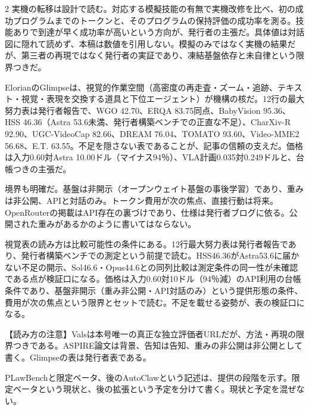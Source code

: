 \documentclass[lualatex,a4paper,10pt]{jlreq}
\begin{document}
\begin{multicols}{2}
実機の転移は設計で読む。対応する模擬技能の有無で実機改修を比べ、初の成功プログラムまでのトークンと、そのプログラムの保持評価の成功率を測る。技能ありで到達が早く成功率が高いという方向が、発行者の主張だ。具体値は対話図に隠れて読めず、本稿は数値を引用しない。模擬のみではなく実機の結果だが、第三者の再現ではなく発行者の実証であり、凍結基盤依存と未自律という限界つきだ。
\cite{B57,B56,B89}


ElorianのGlimpseは、視覚的作業空間（高密度の再走査・ズーム・追跡、テキスト・視覚・表現を交換する道具と下位エージェント）が機構の核だ。12行の最大努力表は発行者報告で、WGO 42.70、ERQA 83.75同点、BabyVision 95.36、HSS 46.36（Astra 53.6未満、発行者構築ベンチでの正直な不足）、CharXiv-R 92.90、UGC-VideoCap 82.66、DREAM 76.04、TOMATO 93.60、Video-MME2 56.68、E.T. 63.55。不足を隠さない表であることが、記事の信頼の支えだ。価格は入力0.60対Astra 10.00ドル（マイナス94％）、VLA計画0.035対0.249ドルと、台帳つきの主張だ。
\cite{B58,B59,B88}


境界も明確だ。基盤は非開示（オープンウェイト基盤の事後学習）であり、重みは非公開、APIと対話のみ。トークン費用が次の焦点、直接行動は将来。OpenRouterの掲載はAPI存在の裏づけであり、仕様は発行者ブログに依る。公開された重みがあるかのように書いてはならない。
\cite{B58,B59,B88}


視覚表の読み方は比較可能性の条件にある。12行最大努力表は発行者報告であり、発行者構築ベンチでの測定という前提で読む。HSS46.36がAstra53.6に届かない不足の開示、Sol46.6・Opus44.6との同列比較は測定条件の同一性が未確認である点が検証口になる。価格は入力0.60対10ドル（94％減）のAPI利用の台帳条件であり、基盤非開示（重み非公開・API対話のみ）という提供形態の条件、費用が次の焦点という限界とセットで読む。不足を載せる姿勢が、表の検証口になる。
\cite{B58,B59,B88}




\begin{tcolorbox}[colback=SurveySoft,colframe=SurveyRule,arc=1mm,boxrule=0.4pt,left=2mm,right=2mm]
【読み方の注意】Valsは本号唯一の真正な独立評価者URLだが、方法・再現の限界つきである。ASPIRE論文は背景、告知は告知、重みの非公開は非公開として書く。Glimpseの表は発行者表である。
\end{tcolorbox}
\cite{B55,B53,B54,B57,B56,B58,B59,B88}

PLawBenchと限定ベータ、後のAutoClawという記述は、提供の段階を示す。限定ベータという現状と、後の拡張という予定を分けて書く。現状と予定を混ぜない。
\cite{B55,B53,B54}



\end{multicols}
\end{document}
